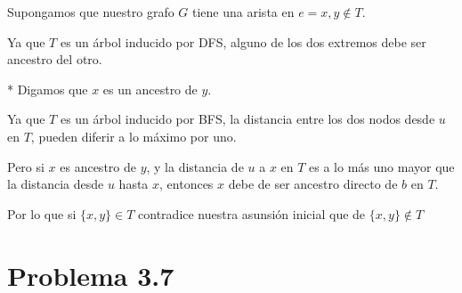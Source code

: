 \documentclass{article}
\begin{document}

Supongamos que nuestro grafo $G$ tiene una arista en $e = {x,y} \not\in T$.

Ya que $T$ es un árbol inducido por DFS, alguno de los dos extremos debe ser
ancestro del otro.

* Digamos que $x$ es un ancestro de $y$.

Ya que $T$ es un árbol inducido por BFS, la distancia entre los dos nodos desde
$u$ en $T$, pueden diferir a lo máximo por uno.

Pero si $x$ es ancestro de $y$, y la distancia de $u$ a $x$ en $T$ es a lo más
uno mayor que la distancia desde $u$ hasta $x$, entonces $x$ debe de ser
ancestro directo de $b$ en $T$.

Por lo que si $\{x,y\} \in T$ contradice nuestra asunsión inicial que de
$\{x,y\} \not\in T$

\section*{Problema 3.7}

% 
% 
% 
% 
% 
\end{document}
